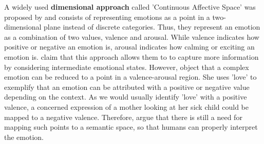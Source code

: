 \newline\newline
A widely used \textbf{dimensional approach} called 'Continuous Affective Space' was proposed by \citet{Hupont:2010:FacialEmotionsIn2DAffectiveSpace} and consists of representing emotions as a point in a two-dimensional plane instead of discrete categories. Thus, they represent an emotion as a combination of two values, valence and arousal. While valence indicates how positive or negative an emotion is, arousal indicates how calming or exciting an emotion is. \citet{Hupont:2010:FacialEmotionsIn2DAffectiveSpace} claim that this approach allows them to to capture more information by considering intermediate emotional states.
\newline\newline
However, \citet{Salah:2018:VideoBasedER} object that a complex emotion can be reduced to a point in a valence-arousal region. She uses 'love' to exemplify that an emotion can be attributed with a positive or negative value depending on the context. As we would usually identify 'love' with a positive valence, a concerned expression of a mother looking at her sick child could be mapped to a negative valence. Therefore, \citet{Salah:2018:VideoBasedER} argue that there is still a need for mapping such points to a semantic space, so that humans can properly interpret the emotion.
